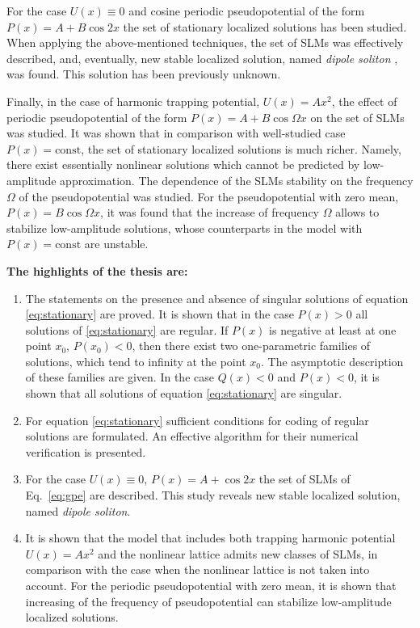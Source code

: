 \documentclass[candidate, href, colorlinks]{disser}
\begin{document}
For the case $U(x) \equiv 0$ and cosine periodic pseudopotential of the form $P(x) = A + B \cos 2x$ the set of stationary localized solutions has been studied.
When applying the above-mentioned techniques, the set of SLMs was effectively described, and, eventually, new stable localized solution, named {\it dipole soliton} \cite{LebedevAlfimovMalomed}, was found.
This solution has been previously unknown.

Finally, in the case of harmonic trapping potential, $U(x) = A x^2$, the effect of periodic pseudopotential of the form $P(x) = A + B \cos \Omega x$ on the set of SLMs was studied.
It was shown that in comparison with well-studied case $P(x) = \mathrm{const}$, the set of stationary localized solutions is much richer.
Namely, there exist essentially nonlinear solutions which cannot be predicted by low-amplitude approximation.
The dependence of the SLMs stability on the frequency $\Omega$ of the pseudopotential was studied.
For the pseudopotential with zero mean, $P(x) = B \cos \Omega x$, it was found that the increase of frequency $\Omega$ allows to stabilize low-amplitude solutions, whose counterparts in the model with $P(x) = \mathrm{const}$ are unstable.


\textbf{The highlights of the thesis are:}
\begin{enumerate}
	\item The statements on the presence and absence of singular solutions of equation \eqref{eq:stationary} are proved.
		It is shown that in the case $P(x) > 0$ all solutions of \eqref{eq:stationary} are regular.
		If $P(x)$ is negative at least at one point $x_0$, $P(x_0) < 0$, then there exist two one-parametric families of solutions, which tend to infinity at the point $x_0$.
		The asymptotic description of these families are given.
		In the case $Q(x) < 0$ and $P(x) < 0$, it is shown that all solutions of equation \eqref{eq:stationary} are singular.
	\item For equation \eqref{eq:stationary} sufficient conditions for coding of regular solutions are formulated.
		An effective algorithm for their numerical verification is presented.
	\item For the case $U(x) \equiv 0$, $P(x) = A + \cos 2x$ the set of SLMs of Eq.~\eqref{eq:gpe} are described.
		This study reveals new stable localized solution, named {\it dipole soliton}.
	\item It is shown that the model that includes both trapping harmonic potential $U(x) = A x^2$ and the nonlinear lattice admits new classes of SLMs, in comparison with the case when the nonlinear lattice is not taken into account.
		For the periodic pseudopotential with zero mean, it is shown that increasing of the frequency of pseudopotential can stabilize low-amplitude localized solutions.
\end{enumerate}
\end{document}

